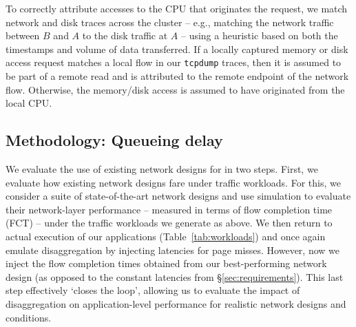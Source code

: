 To correctly attribute accesses to the CPU that originates the request, we match network and disk traces across the cluster -- e.g., matching the network traffic between $B$ and $A$ to the disk traffic at $A$ -- using a heuristic based on both the timestamps and volume of data transferred. 
If a locally captured memory or disk access request matches a local flow in our {\tt tcpdump} traces, then it is assumed to be part of a remote read and is attributed to the remote endpoint of the network flow.
Otherwise, the memory/disk access is assumed to have originated from the local CPU. 
%

\subsection{Methodology: Queueing delay}
\label{ssec:ssmethod}
We evaluate the use of existing network designs for \dis in two steps.
First, we evaluate how existing network designs fare under \dis traffic workloads. 
For this, we consider a suite of state-of-the-art network designs and use simulation to evaluate their network-layer performance -- measured in terms of flow completion time (FCT) -- under the traffic workloads we generate as above.
We then return to actual execution of our applications (Table~\ref{tab:workloads}) and once again emulate disaggregation by injecting latencies for page misses. 
However, now we inject the flow completion times obtained from our best-performing network design (as opposed to the constant latencies from \S\ref{sec:requirements}). This last step effectively `closes the loop', allowing us to evaluate the impact of disaggregation on application-level performance for realistic network designs and conditions. 

